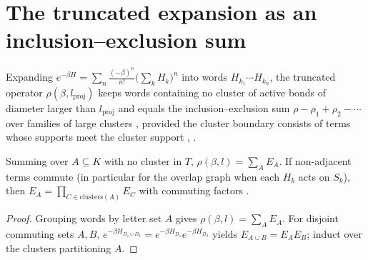 \section{The truncated expansion as an inclusion--exclusion sum}
\label{sec:hastings_cluster_truncation}


Expanding $e^{-\beta H}=\sum_n\frac{(-\beta)^n}{n!}\bigl(\sum_kH_k\bigr)^n$ into
words $H_{k_1}\cdots H_{k_n}$, the truncated operator
$\rho(\beta,l_{\mathrm{proj}})$ keeps words containing no cluster of active
bonds of diameter larger than $l_{\mathrm{proj}}$
\cite[lines 1090--1114]{Hastings2006Solving} and equals the inclusion--exclusion
sum $\rho-\rho_1+\rho_2-\cdots$ over families of large clusters
\cite[lines 1218--1224]{Hastings2006Solving}, provided the cluster boundary
consists of terms whose supports meet the cluster support
\cite[lines 1131--1134]{Hastings2006Solving},
\cite{gap:hastings05_cluster_boundary}.

\begin{lemma}
    \label{thm:hastings_truncation_cluster_products}
    \leanok
    
    Summing over $A\subseteq K$ with no cluster in $T$,
    $\rho(\beta,l)=\sum_AE_A$. If non-adjacent terms commute (in particular for
    the overlap graph when each $H_k$ acts on $S_k$), then
    $E_A=\prod_{C\in\mathrm{clusters}(A)}E_C$ with commuting factors
    \cite[lines 1108--1110]{Hastings2006Solving}.
\end{lemma}
\begin{proof}
    \leanok
    
    Grouping words by letter set $A$ gives $\rho(\beta,l)=\sum_AE_A$. For
    disjoint commuting sets $A,B$,
    $e^{-\beta H_{D_1\cup D_2}}=e^{-\beta H_{D_1}}e^{-\beta H_{D_2}}$ yields
    $E_{A\cup B}=E_AE_B$; induct over the clusters partitioning $A$.
\end{proof}

